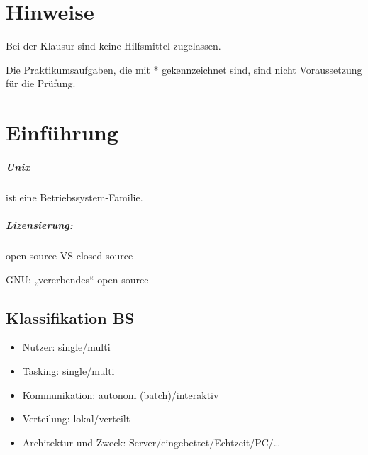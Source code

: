 \newcommand{\customDir}{../}







%



\maketitle
\newpage
\tableofcontents
\newpage

\chapter*{Hinweise}
Bei der Klausur sind keine Hilfsmittel zugelassen.

Die Praktikumsaufgaben, die mit * gekennzeichnet sind, sind nicht Voraussetzung für die Prüfung.

\chapter{Einführung}

\paragraph{Unix} ist eine Betriebssystem-Familie.

\paragraph{Lizensierung:} open source VS closed source

GNU: „vererbendes“ open source
\section{Klassifikation BS}
\begin{itemize}
\item Nutzer: single/multi
\item Tasking: single/multi
\item Kommunikation: autonom (batch)/interaktiv
\item Verteilung: lokal/verteilt
\item Architektur und Zweck: Server/eingebettet/Echtzeit/PC/…
\end{itemize}

